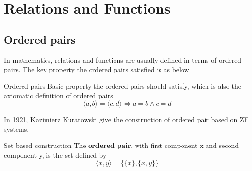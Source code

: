 \section{Relations and Functions}
\subsection{Ordered pairs}
In mathematics, relations and functions are usually defined in terms of ordered pairs. The key property the ordered pairs satisfied is as below
\begin{definition}{Ordered pairs}{}
    Basic property the ordered pairs should satisfy, which is also the axiomatic definition of ordered pairs
    \begin{equation*}
        \langle a,b \rangle = \langle c,d \rangle \iff a = b \land c = d
    \end{equation*}
\end{definition}
In 1921, Kazimierz Kuratowski give the construction of ordered pair based on ZF systems. 
\begin{definition}{Set based construction}{}
    The \textbf{ordered pair}, with first component x and second component y, is the set defined by
    \begin{equation*}
        \langle x,y \rangle = \{\{x\}, \{x, y\}\}
    \end{equation*}
\end{definition}
